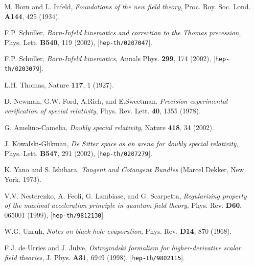 \documentclass[a4paper,aps,prd,showkeys,showpacs,superscriptaddress,preprint]{revtex4}
\begin{document}
\begin{thebibliography}{00}
 M. Born and L. Infeld,
 \textit{Foundations of the new field theory},
 Proc. Roy. Soc. Lond. \textbf{A144}, 425 (1934).

 F.P. Schuller, \textit{Born-Infeld kinematics and correction to the Thomas
                  precession}, Phys. Lett. \textbf{B540}, 119 (2002),
[{\tt hep-th/0207047}].

 F.P. Schuller, \textit{Born-Infeld kinematics}, Annals
Phys. \textbf{299}, 174 (2002), [{\tt hep-th/0203079}].

 L.H. Thomas, Nature \textbf{117}, 1 (1927).

 D. Newman, G.W. Ford, A.Rich, and E.Sweetman, \textit{Precision experimental
verification of special relativity}, Phys. Rev. Lett.
\textbf{40}, 1355 (1978).

 G. Amelino-Camelia, \textit{Doubly special relativity}, Nature
\textbf{418}, 34 (2002).

J. Kowalski-Glikman,
\textit{De Sitter space as an arena for doubly special relativity},
 Phys. Lett. \textbf{B547}, 291 (2002), 
[{\tt hep-th/0207279}].

 K. Yano and S. Ishihara, \textit{Tangent and Cotangent
Bundles} (Marcel Dekker, New York, 1973).
 
 V.V. Nesterenko, A. Feoli, G. Lambiase, and G. Scarpetta,
 \textit{Regularizing property of the maximal acceleration principle in
 quantum  field theory},
 Phys. Rev. \textbf{D60}, 065001 (1999), [{\tt hep-th/9812130}]


W.G. Unruh, \textit{Notes on black-hole evaporation}, Phys. Rev.  
\textbf{D14}, 
870 (1968).

F.J. de Urries and J. Julve,
 \textit{Ostrogradski formalism for higher-derivative scalar field theories},
 J. Phys. \textbf{A31}, 6949 (1998),
[{\tt hep-th/9802115}].

\end{thebibliography}
\end{document}
